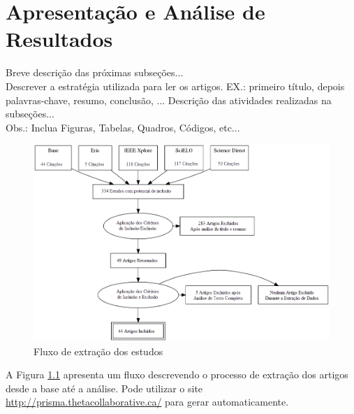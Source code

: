 \chapter{Apresentação e Análise de Resultados}

Breve descrição das próximas subseções...\\

Descrever a estratégia utilizada para ler os artigos. EX.: primeiro título, depois palavras-chave, resumo, conclusão, ...
Descrição das atividades realizadas na subseções...\\
Obs.: Inclua Figuras, Tabelas, Quadros, Códigos, etc...

\begin{figure}[htb]
	\caption{\label{fig:criterios}Fluxo de extração dos estudos}   
	\begin{center}
		\includegraphics[scale=0.7]{Imagens/EstrategiadeBusca.dot.png}
	\end{center}
\end{figure}

A Figura \ref{fig:criterios} apresenta um fluxo descrevendo o processo de extração dos artigos desde a base até a análise. Pode utilizar o site \url{http://prisma.thetacollaborative.ca/} para gerar automaticamente.


